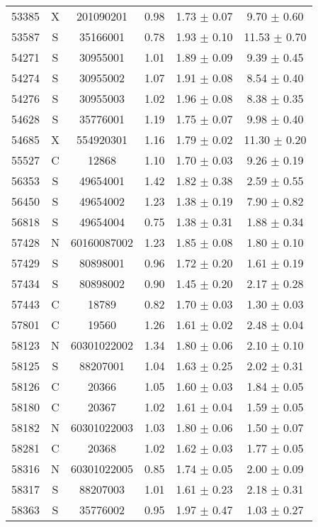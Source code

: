 \begin{longtable*}[c]{cccccc}
53385 & X & 201090201 & 0.98 & 1.73 $\pm$ 0.07 & 9.70 $\pm$ 0.60 \\ 
53587 & S & 35166001 & 0.78 & 1.93 $\pm$ 0.10 & 11.53 $\pm$ 0.70 \\ 
54271 & S & 30955001 & 1.01 & 1.89 $\pm$ 0.09 & 9.39 $\pm$ 0.45 \\ 
54274 & S & 30955002 & 1.07 & 1.91 $\pm$ 0.08 & 8.54 $\pm$ 0.40 \\ 
54276 & S & 30955003 & 1.02 & 1.96 $\pm$ 0.08 & 8.38 $\pm$ 0.35 \\ 
54628 & S & 35776001 & 1.19 & 1.75 $\pm$ 0.07 & 9.98 $\pm$ 0.40 \\ 
54685 & X & 554920301 & 1.16 & 1.79 $\pm$ 0.02 & 11.30 $\pm$ 0.20 \\ 
55527 & C & 12868 & 1.10 & 1.70 $\pm$ 0.03 & 9.26 $\pm$ 0.19 \\ 
56353 & S & 49654001 & 1.42 & 1.82 $\pm$ 0.38 & 2.59 $\pm$ 0.55 \\ 
56450 & S & 49654002 & 1.23 & 1.38 $\pm$ 0.19 & 7.90 $\pm$ 0.82 \\ 
56818 & S & 49654004 & 0.75 & 1.38 $\pm$ 0.31 & 1.88 $\pm$ 0.34 \\ 
57428 & N & 60160087002 & 1.23 & 1.85 $\pm$ 0.08 & 1.80 $\pm$ 0.10 \\ 
57429 & S & 80898001 & 0.96 & 1.72 $\pm$ 0.20 & 1.61 $\pm$ 0.19 \\ 
57434 & S & 80898002 & 0.90 & 1.45 $\pm$ 0.20 & 2.17 $\pm$ 0.28 \\ 
57443 & C & 18789 & 0.82 & 1.70 $\pm$ 0.03 & 1.30 $\pm$ 0.03 \\ 
57801 & C & 19560 & 1.26 & 1.61 $\pm$ 0.02 & 2.48 $\pm$ 0.04 \\ 
58123 & N & 60301022002 & 1.34 & 1.80 $\pm$ 0.06 & 2.10 $\pm$ 0.10 \\ 
58125 & S & 88207001 & 1.04 & 1.63 $\pm$ 0.25 & 2.02 $\pm$ 0.31 \\ 
58126 & C & 20366 & 1.05 & 1.60 $\pm$ 0.03 & 1.84 $\pm$ 0.05 \\ 
58180 & C & 20367 & 1.02 & 1.61 $\pm$ 0.04 & 1.59 $\pm$ 0.05 \\ 
58182 & N & 60301022003 & 1.03 & 1.80 $\pm$ 0.06 & 1.50 $\pm$ 0.07 \\ 
58281 & C & 20368 & 1.02 & 1.62 $\pm$ 0.03 & 1.77 $\pm$ 0.05 \\ 
58316 & N & 60301022005 & 0.85 & 1.74 $\pm$ 0.05 & 2.00 $\pm$ 0.09 \\ 
58317 & S & 88207003 & 1.01 & 1.61 $\pm$ 0.23 & 2.18 $\pm$ 0.31 \\ 
58363 & S & 35776002 & 0.95 & 1.97 $\pm$ 0.47 & 1.03 $\pm$ 0.27 \\ 

\end{longtable*}
